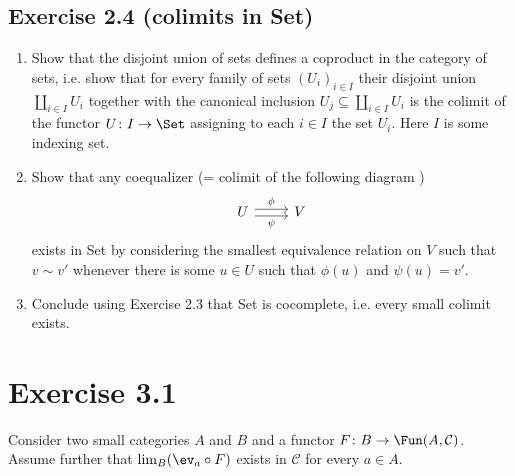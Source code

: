 \subsection{ Exercise 2.4 (colimits in Set) }
\begin{enumerate}[label=(\alph*)]
    \item 
    Show that the disjoint union of sets defines a coproduct in the category of sets, i.e. show that for every family of sets $ ( U_i )_{ i \in I } $ their disjoint union $\coprod_{ i \in I } U_i $ together with the canonical inclusion $ U_j \subseteq \coprod_{ i \in I } U_i $ is the colimit of the functor $ U \colon I \to \Set $ assigning to each $ i \in I $ the set $ U_i $.
    Here $ I $ is some indexing set.

    \item 
    Show that any coequalizer (= colimit of the following diagram ) 
    \[
    \begin{tikzcd}
        U 
        \ar[r, shift left, " \phi "]
        \ar[r, shift right, " \psi "']
        & 
        V
    \end{tikzcd}
    \]
    exists in Set by considering the smallest equivalence relation on $ V $ such that $ v \sim v' $ whenever there is some $ u \in U $ such that $ \phi ( u ) $ and $ \psi ( u ) = v' $.

    \item 
    Conclude using Exercise 2.3 that Set is cocomplete, i.e. every small colimit exists.
\end{enumerate}

\section{ Exercise 3.1 }

Consider two small categories $ A $ and $ B $ and a functor $ F \colon B \to \Fun ( A , \mathcal{ C } ) $. Assume further that $ \lim_B ( \ev_a \circ F ) $ exists in $ \mathcal{ C } $ for every $ a \in A $.

